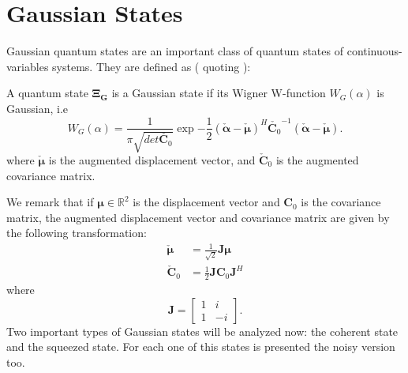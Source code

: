 \section{Gaussian States}
    \label{def:Gaussian}
    Gaussian quantum states are an important class of quantum states of continuous-variables systems.
    They are defined as (\cite{tesiGuerrini} quoting \cite{Gaussian1,Gaussian2,Gaussian3,Gaussian4,Gaussian5}):
    \begin{definition}
        A quantum state $\pmb{\Xi_G}$ is a Gaussian state if its Wigner W-function $W_G(\alpha)$
        is Gaussian, i.e
        \begin{equation}
            W_G(\alpha)=\frac{1}{\pi\sqrt{det\check{\pmb{C}_0}}}\exp{
                -\frac{1}{2}(\check{\pmb{\alpha}}-\check{\pmb{\mu}})^H
                \check{\pmb{C}_0}^{-1}(\check{\pmb{\alpha}}-\check{\pmb{\mu}})}.
        \end{equation}
        where $\check{\pmb{\mu}} $ is the augmented displacement vector, and $\check{\pmb{C}}_0$ 
        is the augmented covariance matrix. 
    \end{definition}
    
    We remark that if $\pmb{\mu} \in \mathbb{R}^2$ is the 
    displacement vector and $\pmb{C}_0$ is the covariance matrix, the augmented displacement vector
    and covariance matrix are given by the following transformation:
    \begin{equation}
        \begin{split}
            \check{\pmb{\mu}} &= \frac{1}{\sqrt{2}} \pmb{J} \pmb{\mu}\\
            \check{\pmb{C}}_0 &= \frac{1}{2} \pmb{J} \pmb{C}_0 \pmb{J}^H
        \end{split}
    \end{equation}
    where
    \begin{equation*}
        \pmb{J} = 
        \begin{bmatrix}
            1 & i\\
            1 & -i
        \end{bmatrix}.
    \end{equation*}
    Two important types of Gaussian states will be analyzed now: the coherent state and the
    squeezed state. For each one of this states is presented the noisy version too.

